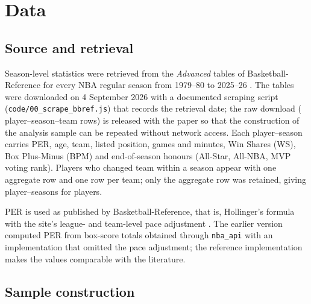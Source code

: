 \section{Data}\label{sec:data}

\subsection{Source and retrieval}

Season-level statistics were retrieved from the \emph{Advanced} tables of Basketball-Reference for every NBA regular season from 1979--80 to 2025--26 \citep{bbref2026}. The tables were downloaded on 4 September 2026 with a documented scraping script (\texttt{code/00\_scrape\_bbref.js}) that records the retrieval date; the raw download (\nRawRows{} player--season--team rows) is released with the paper so that the construction of the analysis sample can be repeated without network access. Each player--season carries PER, age, team, listed position, games and minutes, Win Shares (WS), Box Plus-Minus (BPM) and end-of-season honours (All-Star, All-NBA, MVP voting rank). Players who changed team within a season appear with one aggregate row and one row per team; only the aggregate row was retained, giving \nPlayerSeasons{} player--seasons for \nAllPlayers{} players.

PER is used as published by Basketball-Reference, that is, Hollinger's formula with the site's league- and team-level pace adjustment \citep{hollinger2002,bbrefper}. The earlier version computed PER from box-score totals obtained through \texttt{nba\_api} \citep{nbaapi} with an implementation that omitted the pace adjustment; the reference implementation makes the values comparable with the literature.

\subsection{Sample construction}

